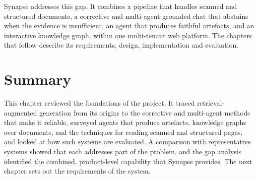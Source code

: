 Synapse addresses this gap. It combines a pipeline that handles scanned and
structured documents, a corrective and multi-agent grounded chat that abstains
when the evidence is insufficient, an agent that produces faithful artefacts, and
an interactive knowledge graph, within one multi-tenant web platform. The
chapters that follow describe its requirements, design, implementation and
evaluation.

\section{Summary}

This chapter reviewed the foundations of the project. It traced retrieval-augmented
generation from its origins to the corrective and multi-agent methods that make
it reliable, surveyed agents that produce artefacts, knowledge graphs over
documents, and the techniques for reading scanned and structured pages, and
looked at how such systems are evaluated. A comparison with representative
systems showed that each addresses part of the problem, and the gap analysis
identified the combined, product-level capability that Synapse provides. The next
chapter sets out the requirements of the system.
